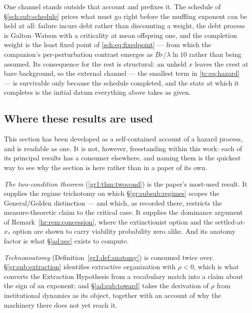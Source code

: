 \documentclass[11pt]{article}
\numberwithin{equation}{section}
\theoremstyle{plain}
\theoremstyle{definition}
\theoremstyle{remark}
\begin{document}
One channel stands outside that account and prefixes it. The schedule of
\S\ref{sch:sub:schedule} prices what must go right before the muffling
exponent can be held at all: failure incurs debt rather than discounting a
weight, the debt process is Galton--Watson with a criticality at mean
offspring one, and the completion weight is the least fixed point of
\eqref{sch:eq:fixedpoint} --- from which the companion's per-perturbation
contrast emerges as $Br/\lambda\ln10$ rather than being assumed. Its
consequence for the rest is structural: an unheld $x$ leaves the crest at
bare background, so the external channel --- the smallest term in
\eqref{tc:eq:hazard} --- is survivable only because the schedule
completed, and the state at which it completes is the initial datum
everything above takes as given.



\subsection*{Where these results are used}\label{gr1:sub:consumers}

This section has been developed as a self-contained account of a hazard
process, and is readable as one. It is not, however, freestanding within
this work: each of its principal results has a consumer elsewhere, and
naming them is the quickest way to see why the section is here rather
than in a paper of its own.

\emph{The two-condition theorem} (\ref{gr1:thm:twocond}) is the paper's
most-used result. It supplies the regime trichotomy on which
\S\ref{gr:subsub:regimes} scopes the General/Golden distinction --- and
which, as recorded there, restricts the measure-theoretic claim to the
critical case. It supplies the dominance argument of
Remark~\ref{hr:rem:concession}, where the extinctionist option and the
settled-at-$x_\ast$ option are shown to carry viability probability zero
alike. And its anatomy factor is what \S\ref{ad:sec} exists to compute.

\emph{Technoanatomy} (Definition~\ref{gr1:def:anatomy}) is consumed
twice over. \S\ref{gr:sub:extraction} identifies extractive organization
with $\rho<0$, which is what converts the Extraction Hypothesis from a
vocabulary match into a claim about the sign of an exponent; and
\S\ref{ad:sub:toward} takes the derivation of $\rho$ from institutional
dynamics as its object, together with an account of why the machinery
there does not yet reach it.
\end{document}

